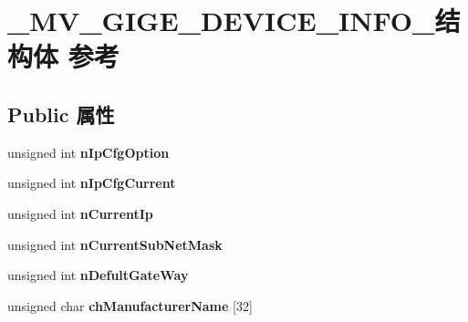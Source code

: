 \hypertarget{struct___m_v___g_i_g_e___d_e_v_i_c_e___i_n_f_o__}{}\section{\+\_\+\+M\+V\+\_\+\+G\+I\+G\+E\+\_\+\+D\+E\+V\+I\+C\+E\+\_\+\+I\+N\+F\+O\+\_\+结构体 参考}
\label{struct___m_v___g_i_g_e___d_e_v_i_c_e___i_n_f_o__}
\subsection*{Public 属性}
\begin{DoxyCompactItemize}
\item 
\mbox{\label{struct___m_v___g_i_g_e___d_e_v_i_c_e___i_n_f_o___a7fea0144a1dc5bdb3b41e891ea133a9f}} 
unsigned int {\bfseries n\+Ip\+Cfg\+Option}
\item 
\mbox{\label{struct___m_v___g_i_g_e___d_e_v_i_c_e___i_n_f_o___ac3432e221d78243fc7ece2f110ee51bf}} 
unsigned int {\bfseries n\+Ip\+Cfg\+Current}
\item 
\mbox{\label{struct___m_v___g_i_g_e___d_e_v_i_c_e___i_n_f_o___a1c6e5a9e358e4c24cf4bc6150ef7a909}} 
unsigned int {\bfseries n\+Current\+Ip}
\item 
\mbox{\label{struct___m_v___g_i_g_e___d_e_v_i_c_e___i_n_f_o___a10598d69007d2e00ed48fb6884515823}} 
unsigned int {\bfseries n\+Current\+Sub\+Net\+Mask}
\item 
\mbox{\label{struct___m_v___g_i_g_e___d_e_v_i_c_e___i_n_f_o___acd2f8681f4c361d3469898cd29ed0324}} 
unsigned int {\bfseries n\+Defult\+Gate\+Way}
\item 
\mbox{\label{struct___m_v___g_i_g_e___d_e_v_i_c_e___i_n_f_o___ae842442337bb357a7c0d80402dd09a74}} 
unsigned char {\bfseries ch\+Manufacturer\+Name} \mbox{[}32\mbox{]}
\item 
\mbox{\label{struct___m_v___g_i_g_e___d_e_v_i_c_e___i_n_f_o___ab7338402ae61dd32d57f606713c594a4}} 

\end{DoxyCompactItemize}
